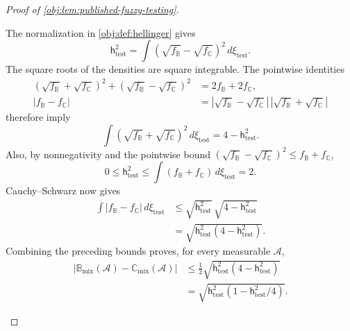 \documentclass[11pt]{article}
\begin{document}
\begin{proof}[Proof of \cref{obj:lem:published-fuzzy-testing}]
\begin{enumerate}
The normalization in \cref{obj:def:hellinger} gives
\[
\mathsf h_{\mathrm{test}}^2
=\int(\sqrt{f_{\mathbb B}}-\sqrt{f_{\mathbb C}})^2\,d\xi_{\mathrm{test}}.
\]
The square roots of the densities are square integrable. The pointwise identities
\[
\begin{aligned}
(\sqrt{f_{\mathbb B}}+\sqrt{f_{\mathbb C}})^2
+(\sqrt{f_{\mathbb B}}-\sqrt{f_{\mathbb C}})^2
&=2f_{\mathbb B}+2f_{\mathbb C},\\
|f_{\mathbb B}-f_{\mathbb C}|
&=|\sqrt{f_{\mathbb B}}-\sqrt{f_{\mathbb C}}|\,
  |\sqrt{f_{\mathbb B}}+\sqrt{f_{\mathbb C}}|
\end{aligned}
\]
therefore imply
\[
\int(\sqrt{f_{\mathbb B}}+\sqrt{f_{\mathbb C}})^2\,d\xi_{\mathrm{test}}
=4-\mathsf h_{\mathrm{test}}^2.
\]
Also, by nonnegativity and the pointwise bound
\((\sqrt{f_{\mathbb B}}-\sqrt{f_{\mathbb C}})^2
\le f_{\mathbb B}+f_{\mathbb C}\),
\[
0\le\mathsf h_{\mathrm{test}}^2
\le\int(f_{\mathbb B}+f_{\mathbb C})\,d\xi_{\mathrm{test}}
=2.
\]
Cauchy--Schwarz now gives
\[
\begin{aligned}
\int|f_{\mathbb B}-f_{\mathbb C}|\,d\xi_{\mathrm{test}}
&\le
\sqrt{\mathsf h_{\mathrm{test}}^2}\,
\sqrt{4-\mathsf h_{\mathrm{test}}^2}\\
&=\sqrt{\mathsf h_{\mathrm{test}}^2
                 (4-\mathsf h_{\mathrm{test}}^2)}.
\end{aligned}
\]
Combining the preceding bounds proves, for every measurable \(\mathcal A\),
\[
\begin{aligned}
|\mathbb B_{\mathrm{mix}}(\mathcal A)
-\mathbb C_{\mathrm{mix}}(\mathcal A)|
&\le\frac12
 \sqrt{\mathsf h_{\mathrm{test}}^2(4-\mathsf h_{\mathrm{test}}^2)}\\
&=\sqrt{\mathsf h_{\mathrm{test}}^2
                   (1-\mathsf h_{\mathrm{test}}^2/4)}.
\end{aligned}
\]


\end{enumerate}
\end{proof}
\end{document}

